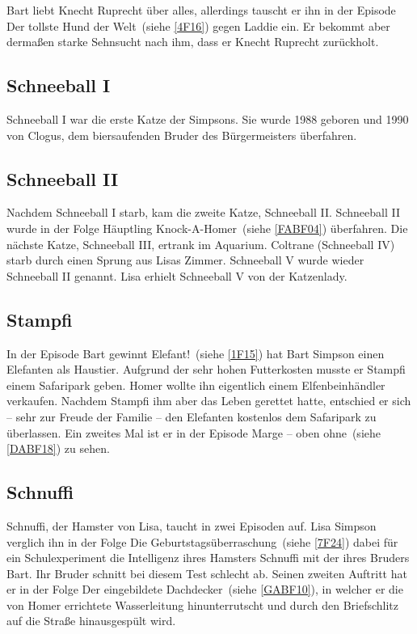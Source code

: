 Bart liebt Knecht Ruprecht über alles, allerdings tauscht er ihn in der Episode \glqq Der tollste Hund der Welt\grqq\ (siehe \ref{4F16}) gegen Laddie ein. Er bekommt aber dermaßen starke Sehnsucht nach ihm, dass er Knecht Ruprecht zurückholt.


\subsection{Schneeball I}
Schneeball I war die erste Katze der Simpsons. Sie wurde 1988 geboren und 1990 von Clogus, dem biersaufenden Bruder des Bürgermeisters überfahren.

\subsection{Schneeball II}
Nachdem Schneeball I starb, kam die zweite Katze, Schneeball II. Schneeball II wurde in der Folge \glqq Häuptling Knock-A-Homer\grqq\ (siehe \ref{FABF04}) überfahren. Die nächste Katze, Schneeball III, ertrank im Aquarium. Coltrane (Schneeball IV) starb durch einen Sprung aus Lisas Zimmer. Schneeball V wurde wieder Schneeball II genannt. Lisa erhielt Schneeball V von der Katzenlady.


\subsection{Stampfi}
In der Episode \glqq Bart gewinnt Elefant!\grqq\ (siehe \ref{1F15}) hat Bart Simpson einen Elefanten als Haustier. Aufgrund der sehr hohen Futterkosten musste er Stampfi einem Safaripark geben. Homer wollte ihn eigentlich einem Elfenbeinhändler verkaufen. Nachdem Stampfi ihm aber das Leben gerettet hatte, entschied er sich -- sehr zur Freude der Familie -- den Elefanten kostenlos dem Safaripark zu überlassen. Ein zweites Mal ist er in der Episode \glqq Marge -- oben ohne\grqq\ (siehe \ref{DABF18}) zu sehen.

\subsection{Schnuffi}\label{Schnuffi}
Schnuffi, der Hamster von Lisa, taucht in zwei Episoden auf. Lisa Simpson verglich ihn in der Folge \glqq Die Geburtstagsüberraschung\grqq\ (siehe \ref{7F24}) dabei für ein Schulexperiment die Intelligenz ihres Hamsters Schnuffi mit der ihres Bruders Bart. Ihr Bruder schnitt bei diesem Test schlecht ab. Seinen zweiten Auftritt hat er in der Folge \glqq Der eingebildete Dachdecker\grqq\ (siehe \ref{GABF10}), in welcher er die von Homer errichtete Wasserleitung hinunterrutscht und durch den Briefschlitz auf die Straße hinausgespült wird.

